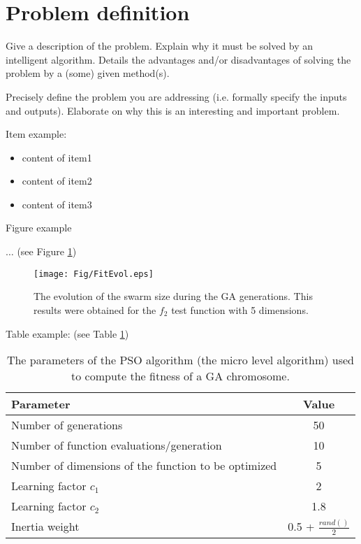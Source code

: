 \documentclass[runningheads,a4paper,11pt]{report}
\begin{document}
\section{Problem definition}
\label{section:problemDefinition}

Give a description of the problem.
Explain why it must be solved by an intelligent algorithm. 
Details the advantages and/or disadvantages of solving the problem by a (some) given method(s).

Precisely define the problem you are addressing (i.e. formally specify the inputs and outputs). Elaborate on why this is an interesting and important problem.


Item example: 

\begin{itemize}
	\item content of item1
 	\item content of item2
 	\item content of item3
\end{itemize}



Figure example 

$\ldots$ (see Figure \ref{swarmsize})

\begin{figure}[htbp]
	\centerline{\texttt{[image: Fig/FitEvol.eps]}}  
	\caption{The evolution of the swarm size during the GA generations. This results were obtained for the $f_2$ test function with 5 dimensions.}
	\label{swarmsize}
\end{figure}


Table example: (see Table \ref{tab3PSO})


\begin{table}[htbp]
	\caption{The parameters of the PSO algorithm (the micro level algorithm) used to compute the fitness of a GA chromosome.}
	\label{tab3PSO}
		\begin{center}
			\begin{tabular}{p{220pt}c}

				\textbf{Parameter}& \textbf{Value} \\
				\hline\hline
 				Number of generations& 50 \\
 				Number of function evaluations/generation& 10 \\
 				Number of dimensions of the function to be optimized& 5 \\
 				Learning factor $c_{1}$& 2 \\
 				Learning factor $c_{2}$ & 1.8\\
 				Inertia weight& 0.5 + $\frac{rand()}{2}$\\
		
			\end{tabular}
		\end{center}
\end{table}
\end{document}
